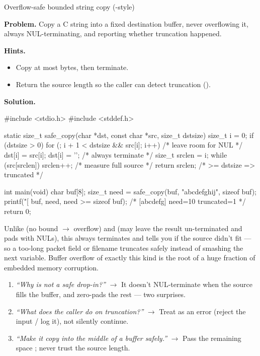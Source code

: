 \begin{gymproblem}{Overflow-safe bounded string copy (-style)}

\textbf{Problem.} Copy a C string into a fixed destination buffer, never
overflowing it, always NUL-terminating, and reporting whether truncation
happened.

\textbf{Hints.}
\begin{itemize}
\item Copy at most  bytes, then terminate.
\item Return the source length so the caller can detect truncation
  ().
\end{itemize}

\attempt

\textbf{Solution.}
\begin{cgym}
#include <stdio.h>
#include <stddef.h>

static size_t safe_copy(char *dst, const char *src, size_t dstsize) {
    size_t i = 0;
    if (dstsize > 0) {
        for (; i + 1 < dstsize && src[i]; i++)   /* leave room for NUL */
            dst[i] = src[i];
        dst[i] = '\0';                           /* always terminate   */
    }
    size_t srclen = i;
    while (src[srclen]) srclen++;                /* measure full source */
    return srclen;                               /* >= dstsize => truncated */
}

int main(void) {
    char buf[8];
    size_t need = safe_copy(buf, "abcdefghij", sizeof buf);
    printf("[%
           buf, need, need >= sizeof buf);        /* [abcdefg] need=10 truncated=1 */
    return 0;
}
\end{cgym}

Unlike  (no bound $\rightarrow$ overflow) and 
(may leave the result un-terminated and pads with NULs), this always
terminates and tells you if the source didn't fit --- so a too-long packet
field or filename truncates safely instead of smashing the next variable. Buffer
overflow of exactly this kind is the root of a huge fraction of embedded memory
corruption.

\followups
\begin{enumerate}
\item \emph{``Why is  not a safe drop-in?''} $\rightarrow$ It
  doesn't NUL-terminate when the source fills the buffer, and zero-pads the
  rest --- two surprises.
\item \emph{``What does the caller do on truncation?''} $\rightarrow$ Treat
   as an error (reject the input / log it), not silently
  continue.
\item \emph{``Make it copy into the middle of a buffer safely.''}
  $\rightarrow$ Pass the remaining space ; never trust
  the source length.
\end{enumerate}
\end{gymproblem}

